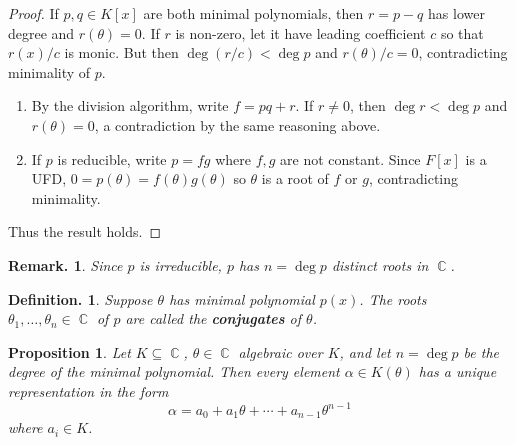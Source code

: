 \documentclass[11pt, a4paper]{memoir}
\DeclareMathOperator{\C}{{\mathbb{C}}}
\theoremstyle{change}
\newtheorem{proposition}[theorem]{Proposition}
\theoremstyle{plain}
\theoremstyle{nonumberplain}
\newtheorem{definition}{Definition.}
\newtheorem{remark}{Remark.}
\newtheorem{proof}{Proof}
\begin{document}
\begin{proof}
    If $p,q\in K[x]$ are both minimal polynomials, then $r=p-q$ has lower degree and $r(\theta)=0$.
    If $r$ is non-zero, let it have leading coefficient $c$ so that $r(x)/c$ is monic.
    But then $\deg(r/c)<\deg p$ and $r(\theta)/c=0$, contradicting minimality of $p$.
    \begin{enumerate}[nolistsep]
        \item By the division algorithm, write $f=pq+r$.
            If $r\neq 0$, then $\deg r<\deg p$ and $r(\theta)=0$, a contradiction by the same reasoning above.
        \item If $p$ is reducible, write $p=fg$ where $f,g$ are not constant.
            Since $F[x]$ is a UFD, $0=p(\theta)=f(\theta)g(\theta)$ so $\theta$ is a root of $f$ or $g$, contradicting minimality.
    \end{enumerate}
    Thus the result holds.
\end{proof}
\begin{remark}
    Since $p$ is irreducible, $p$ has $n=\deg p$ distinct roots in $\C$.
\end{remark}
\begin{definition}
    Suppose $\theta$ has minimal polynomial $p(x)$.
    The roots $\theta_1,\ldots,\theta_n\in\C$ of $p$ are called the \textbf{conjugates} of $\theta$.
\end{definition}
\begin{proposition}
    Let $K\subseteq\C$, $\theta\in \C$ algebraic over $K$, and let $n=\deg p$ be the degree of the minimal polynomial.
    Then every element $\alpha\in K(\theta)$ has a unique representation in the form
    \begin{equation*}
        \alpha=a_0+a_1\theta+\cdots+a_{n-1}\theta^{n-1}
    \end{equation*}
    where $a_i\in K$.
\end{proposition}
\end{document}
